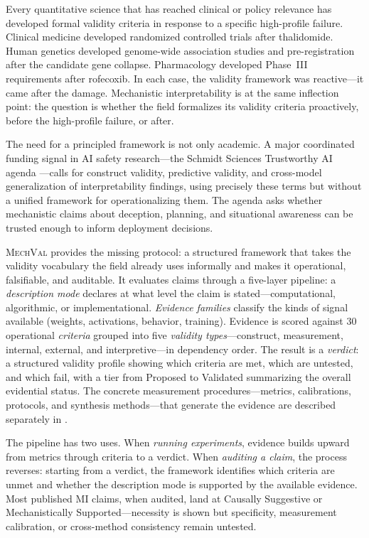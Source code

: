 \documentclass{article}
\newcommand{\mechval}{\textsc{MechVal}}
\begin{document}
Every quantitative science that has reached clinical or policy relevance has developed formal validity criteria in response to a specific high-profile failure. Clinical medicine developed randomized controlled trials after thalidomide. Human genetics developed genome-wide association studies and pre-registration after the candidate gene collapse. Pharmacology developed Phase~III requirements after rofecoxib. In each case, the validity framework was reactive---it came after the damage. Mechanistic interpretability is at the same inflection point: the question is whether the field formalizes its validity criteria proactively, before the high-profile failure, or after.

The need for a principled framework is not only academic.  A major coordinated funding signal in AI safety research---the Schmidt Sciences Trustworthy AI agenda \citep{schmidt2026trustworthy}---calls for construct validity, predictive validity, and cross-model generalization of interpretability findings, using precisely these terms but without a unified framework for operationalizing them.  The agenda asks whether mechanistic claims about deception, planning, and situational awareness can be trusted enough to inform deployment decisions.

\mechval{} provides the missing protocol: a structured framework that takes the validity vocabulary the field already uses informally and makes it operational, falsifiable, and auditable. It evaluates claims through a five-layer pipeline: a \emph{description mode} declares at what level the claim is stated---computational, algorithmic, or implementational. \emph{Evidence families} classify the kinds of signal available (weights, activations, behavior, training). Evidence is scored against 30 operational \emph{criteria} grouped into five \emph{validity types}---construct, measurement, internal, external, and interpretive---in dependency order. The result is a \emph{verdict}: a structured validity profile showing which criteria are met, which are untested, and which fail, with a tier from Proposed to Validated summarizing the overall evidential status. The concrete measurement procedures---metrics, calibrations, protocols, and synthesis methods---that generate the evidence are described separately in .

The pipeline has two uses. When \emph{running experiments}, evidence builds upward from metrics through criteria to a verdict. When \emph{auditing a claim}, the process reverses: starting from a verdict, the framework identifies which criteria are unmet and whether the description mode is supported by the available evidence. Most published MI claims, when audited, land at Causally Suggestive or Mechanistically Supported---necessity is shown but specificity, measurement calibration, or cross-method consistency remain untested.
\end{document}
